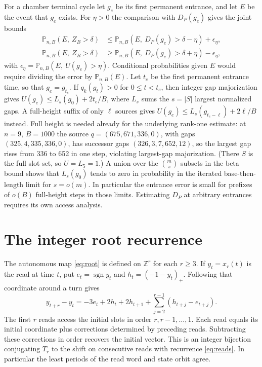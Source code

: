 \documentclass[11pt]{amsart}
\theoremstyle{definition}
\DeclareMathOperator{\sgn}{sgn}
\newcommand{\Z}{\mathbb Z}
\newcommand{\PP}{\mathbb P}
\begin{document}
For a chamber terminal cycle let \(g_e\) be its first permanent
entrance, and let \(E\) be the event that \(g_e\) exists. For
\(\eta>0\) the comparison with \(D_P(g_e)\) gives the joint bounds
\[
 \begin{aligned}
 \PP_{n,B}(E,\ Z_B>\delta)
   &\le\PP_{n,B}(E,\ D_P(g_e)>\delta-\eta)+\epsilon_\eta,\\
 \PP_{n,B}(E,\ Z_B>\delta)
   &\ge\PP_{n,B}(E,\ D_P(g_e)>\delta+\eta)-\epsilon_\eta,
 \end{aligned}
\]
with \(\epsilon_\eta=\PP_{n,B}(E,\ U(g_e)>\eta)\). Conditional
probabilities given \(E\) would require dividing the error by
\(\PP_{n,B}(E)\).
Let \(t_e\) be the first permanent entrance time, so that \(g_e=g_{t_e}\). If \(q_k(g_t)>0\) for
\(0\le t<t_e\), then integer gap majorization \cite[Theorem~1]{G4} gives
\(U(g_e)\le L_s(g_0)+2t_e/B\), where \(L_s\) sums the
\(s=|S|\) largest normalized gaps. A full-height suffix of only
\(\ell\) sources gives \(U(g_e)\le L_s(g_{t_e-\ell})+2\ell/B\) instead.
Full height is needed already for the underlying rank-one estimate: at
\(n=9\), \(B=1000\) the source \(q=(675,671,336,0)\), with gaps
\((325,4,335,336,0)\), has successor gaps \((326,3,7,652,12)\), so the
largest gap rises from 336 to 652 in one step, violating largest-gap
majorization. (There \(S\) is the full slot set, so \(U=L_5=1\).)
A union over the
\(\binom ms\) subsets in the beta bound shows that
\(L_s(g_0)\) tends to zero in probability in the iterated
base-then-length limit for \(s=o(m)\).
In particular the entrance error is small for prefixes of
\(o(B)\) full-height steps in those limits. Estimating \(D_P\) at
arbitrary entrances requires its own access analysis.

\section{The integer root recurrence}\label{sec:root}

The autonomous map \eqref{eq:root} is defined on \(\Z^r\)
for each \(r\ge3\). If \(y_t=x_r(t)\) is the read at
time \(t\), put \(e_t=\sgn y_t\) and \(h_t=(-1-y_t)_+\).
Following that coordinate around a turn gives
\begin{equation}\label{eq:reads}
 y_{t+r}-y_t=-3e_t+2h_t+2h_{t+1}
       +\sum_{j=2}^{r-1}(h_{t+j}-e_{t+j}).
\end{equation}
The first \(r\) reads access the initial slots in order
\(r,r-1,\ldots,1\). Each read equals its initial coordinate
plus corrections determined by preceding reads. Subtracting
these corrections in order recovers the initial vector.
This is an integer bijection conjugating \(T_r\) to the
shift on consecutive reads with recurrence \eqref{eq:reads}.
In particular the least periods of the read word and state
orbit agree.
\end{document}
